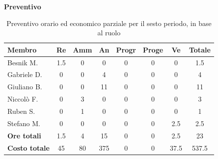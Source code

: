 \documentclass[a4paper,10pt]{article}
\begin{document}
\textbf{Preventivo} \\
\begin{table}[H]
\centering
\begin{tabular}{|l|c|c|c|c|c|c|c|}
\hline
\textbf{Membro} & \textbf{Re} & \textbf{Amm} & \textbf{An} & \textbf{Progr} & \textbf{Proge} & \textbf{Ve} & \textbf{Totale} \\
\hline
Besnik M.   & 1.5   & 0   & 0 & 0 & 0 & 0 & 1.5   \\
Gabriele D. & 0   & 0   & 4   & 0 & 0 & 0 & 4 \\
Giuliano B. & 0 & 0 & 11 & 0 & 0 & 0   & 11 \\
Niccolò F.  & 0   & 3   & 0  & 0 & 0 & 0   & 3   \\
Ruben S.    & 0   & 1 & 0   & 0 & 0 & 0   & 1  \\
Stefano M.  & 0   & 0   & 0  & 0 & 0 & 2.5   & 2.5   \\
\hline
\textbf{Ore totali} & 1.5 & 4 & 15 & 0 & 0 & 2.5 & 23 \\
\hline
\textbf{Costo totale} & 45 & 80 & 375 & 0 & 0 & 37.5 & 537.5 \\
\hline
\end{tabular}
\caption{Preventivo orario ed economico parziale per il sesto periodo, in base al ruolo}
\end{table}
\end{document}
